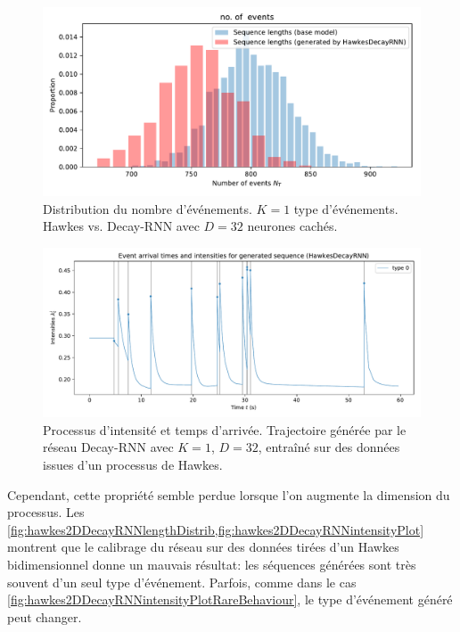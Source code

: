 \documentclass[../main.tex]{subfiles}
\begin{document}
\begin{figure}[htp]
	\includegraphics[width=\linewidth]{../results/seq_length_distrib_HawkesDecayRNN-1d-hidden_32-20181205-143543.pdf}
	\caption{Distribution du nombre d'événements. $K=1$ type d'événements. Hawkes vs. Decay-RNN avec $D=32$ neurones cachés.}\label{fig:hawkes1DDecayRNNlengthDistrib}
\end{figure}

\begin{figure}[htp]
	\includegraphics[width=\linewidth]{../results/intensity_HawkesDecayRNN_1d_hidden32_20181205-143543.pdf}
	\caption{Processus d'intensité et temps d'arrivée. Trajectoire générée par le réseau Decay-RNN avec $K=1$, $D=32$, entraîné sur des données issues d'un processus de Hawkes.}\label{fig:hawkes1DRNNintensityPlot}
\end{figure}

Cependant, cette propriété semble perdue lorsque l'on augmente la dimension du processus. Les \cref{fig:hawkes2DDecayRNNlengthDistrib,fig:hawkes2DDecayRNNintensityPlot} montrent que le calibrage du réseau sur des données tirées d'un Hawkes bidimensionnel donne un mauvais résultat: les séquences générées sont très souvent d'un seul type d'événement. Parfois, comme dans le cas \cref{fig:hawkes2DDecayRNNintensityPlotRareBehaviour}, le type d'événement généré peut changer.
\end{document}
